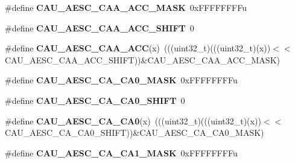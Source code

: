 \begin{DoxyCompactItemize}
\item 
\#define {\bfseries C\+A\+U\+\_\+\+A\+E\+S\+C\+\_\+\+C\+A\+A\+\_\+\+A\+C\+C\+\_\+\+M\+A\+SK}~0x\+F\+F\+F\+F\+F\+F\+F\+Fu\hypertarget{group__CAU__Register__Masks_ga3c6971358e98de3e28c7d2602473a3d3}{}\label{group__CAU__Register__Masks_ga3c6971358e98de3e28c7d2602473a3d3}

\item 
\#define {\bfseries C\+A\+U\+\_\+\+A\+E\+S\+C\+\_\+\+C\+A\+A\+\_\+\+A\+C\+C\+\_\+\+S\+H\+I\+FT}~0\hypertarget{group__CAU__Register__Masks_ga357ec43ab5d98d835aa90df3c8549123}{}\label{group__CAU__Register__Masks_ga357ec43ab5d98d835aa90df3c8549123}

\item 
\#define {\bfseries C\+A\+U\+\_\+\+A\+E\+S\+C\+\_\+\+C\+A\+A\+\_\+\+A\+CC}(x)~(((uint32\+\_\+t)(((uint32\+\_\+t)(x))$<$$<$C\+A\+U\+\_\+\+A\+E\+S\+C\+\_\+\+C\+A\+A\+\_\+\+A\+C\+C\+\_\+\+S\+H\+I\+FT))\&C\+A\+U\+\_\+\+A\+E\+S\+C\+\_\+\+C\+A\+A\+\_\+\+A\+C\+C\+\_\+\+M\+A\+SK)\hypertarget{group__CAU__Register__Masks_ga0a4a08f42b306c2eabc30c85fd071a6d}{}\label{group__CAU__Register__Masks_ga0a4a08f42b306c2eabc30c85fd071a6d}

\item 
\#define {\bfseries C\+A\+U\+\_\+\+A\+E\+S\+C\+\_\+\+C\+A\+\_\+\+C\+A0\+\_\+\+M\+A\+SK}~0x\+F\+F\+F\+F\+F\+F\+F\+Fu\hypertarget{group__CAU__Register__Masks_ga285f901e854cf3e043f122d717e5403d}{}\label{group__CAU__Register__Masks_ga285f901e854cf3e043f122d717e5403d}

\item 
\#define {\bfseries C\+A\+U\+\_\+\+A\+E\+S\+C\+\_\+\+C\+A\+\_\+\+C\+A0\+\_\+\+S\+H\+I\+FT}~0\hypertarget{group__CAU__Register__Masks_gab92e18684282103f4374d6915f54d702}{}\label{group__CAU__Register__Masks_gab92e18684282103f4374d6915f54d702}

\item 
\#define {\bfseries C\+A\+U\+\_\+\+A\+E\+S\+C\+\_\+\+C\+A\+\_\+\+C\+A0}(x)~(((uint32\+\_\+t)(((uint32\+\_\+t)(x))$<$$<$C\+A\+U\+\_\+\+A\+E\+S\+C\+\_\+\+C\+A\+\_\+\+C\+A0\+\_\+\+S\+H\+I\+FT))\&C\+A\+U\+\_\+\+A\+E\+S\+C\+\_\+\+C\+A\+\_\+\+C\+A0\+\_\+\+M\+A\+SK)\hypertarget{group__CAU__Register__Masks_gae8fba02f39d10c4b97783417322f540c}{}\label{group__CAU__Register__Masks_gae8fba02f39d10c4b97783417322f540c}

\item 
\#define {\bfseries C\+A\+U\+\_\+\+A\+E\+S\+C\+\_\+\+C\+A\+\_\+\+C\+A1\+\_\+\+M\+A\+SK}~0x\+F\+F\+F\+F\+F\+F\+F\+Fu\hypertarget{group__CAU__Register__Masks_ga9a7a9ba574f5d6189c7e8f0089f64f8c}{}\label{group__CAU__Register__Masks_ga9a7a9ba574f5d6189c7e8f0089f64f8c}


\end{DoxyCompactItemize}
